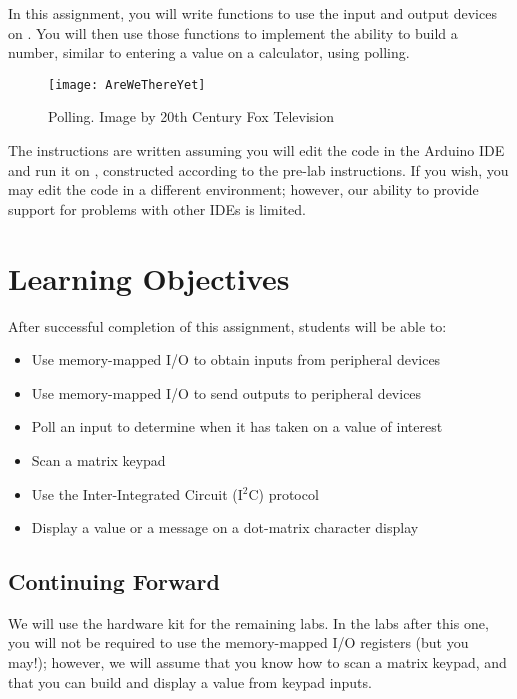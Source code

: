 In this assignment, you will write functions to use the input and output devices on \runtimeenvironment.
You will then use those functions to implement the ability to build a number, similar to entering a value on a calculator, using polling.

\begin{figure}[h]
    \centering
    \texttt{[image: AreWeThereYet]}
    \caption{Polling. \tiny Image by 20th Century Fox Television}
\end{figure}

The instructions are written assuming you will edit the code in the Arduino IDE and run it on \runtimeenvironment, constructed according to the pre-lab instructions.
If you wish, you may edit the code in a different environment; however, our ability to provide support for problems with other IDEs is limited.

\section*{Learning Objectives}

After successful completion of this assignment, students will be able to:
\begin{itemize}
\item Use memory-mapped I/O to obtain inputs from peripheral devices
\item Use memory-mapped I/O to send outputs to peripheral devices
\item Poll an input to determine when it has taken on a value of interest
\item Scan a matrix keypad
\item Use the Inter-Integrated Circuit (I$^2$C) protocol
\item Display a value or a message on a dot-matrix character display
\end{itemize}

\subsection*{Continuing Forward}

We will use the hardware kit for the remaining labs.
In the labs after this one, you will not be required to use the memory-mapped I/O registers (but you may!);
however, we will assume that you know how to scan a matrix keypad, and that you can build and display a value from keypad inputs.

